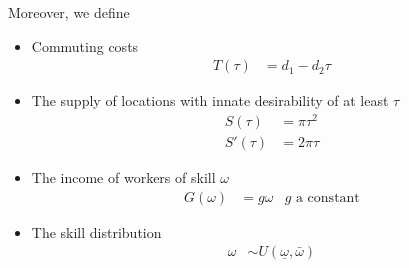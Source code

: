\documentclass[10pt, final]{article}
\begin{document}
Moreover, we define
\begin{itemize}
    \item Commuting costs
    \begin{align*}
        T(\tau) &= d_1 - d_2 \tau
    \end{align*}
    \item The supply of locations with innate desirability of at least $\tau$
    \begin{align*}
        S(\tau) &= \pi \tau^2 \\
        S'(\tau) &= 2 \pi \tau
    \end{align*}
    \item The income of workers of skill $\omega$
    \begin{align*}
        G(\omega) &= g \omega & g \text{ a constant}
    \end{align*}
    \item The skill distribution
    \begin{align*}
        \omega &\sim U(\underline{\omega}, \bar{\omega})
    \end{align*}
\end{itemize}
\end{document}
